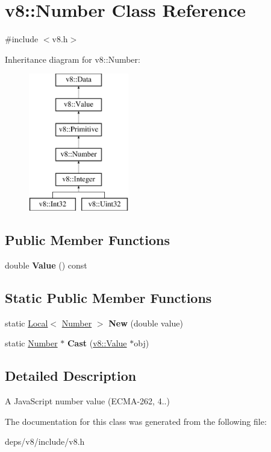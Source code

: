 \hypertarget{classv8_1_1_number}{}\section{v8\+:\+:Number Class Reference}
\label{classv8_1_1_number}


{\ttfamily \#include $<$v8.\+h$>$}

Inheritance diagram for v8\+:\+:Number\+:\begin{figure}[H]
\begin{center}
\leavevmode
\includegraphics[height=6.000000cm]{classv8_1_1_number}
\end{center}
\end{figure}
\subsection*{Public Member Functions}
\begin{DoxyCompactItemize}
\item 
\hypertarget{classv8_1_1_number_ae7ca1af5dd34a7a32a69f57a910ab269}{}double {\bfseries Value} () const \label{classv8_1_1_number_ae7ca1af5dd34a7a32a69f57a910ab269}

\end{DoxyCompactItemize}
\subsection*{Static Public Member Functions}
\begin{DoxyCompactItemize}
\item 
\hypertarget{classv8_1_1_number_aca00a12725ca6fefb326b7e00f3d252c}{}static \hyperlink{classv8_1_1_local}{Local}$<$ \hyperlink{classv8_1_1_number}{Number} $>$ {\bfseries New} (double value)\label{classv8_1_1_number_aca00a12725ca6fefb326b7e00f3d252c}

\item 
\hypertarget{classv8_1_1_number_a053d48e0003104308963a4a7e3881912}{}static \hyperlink{classv8_1_1_number}{Number} $\ast$ {\bfseries Cast} (\hyperlink{classv8_1_1_value}{v8\+::\+Value} $\ast$obj)\label{classv8_1_1_number_a053d48e0003104308963a4a7e3881912}

\end{DoxyCompactItemize}


\subsection{Detailed Description}
A Java\+Script number value (E\+C\+M\+A-\/262, 4..) 

The documentation for this class was generated from the following file\+:\begin{DoxyCompactItemize}
\item 
deps/v8/include/v8.\+h\end{DoxyCompactItemize}

